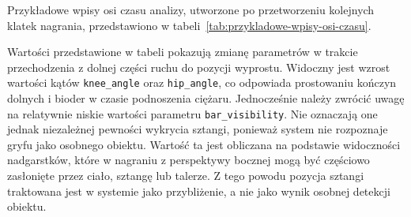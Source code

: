 Przykładowe wpisy osi czasu analizy, utworzone po przetworzeniu kolejnych klatek nagrania, przedstawiono w tabeli~\ref{tab:przykladowe-wpisy-osi-czasu}.

\begin{table}[H]
\centering
\caption{Przykładowe wpisy osi czasu analizy dla kolejnych klatek nagrania, pochodzące ze środkowej fazy ruchu. Źródło: opracowanie własne.}
\label{tab:przykladowe-wpisy-osi-czasu}
\scriptsize
{}
\end{table}

Wartości przedstawione w tabeli pokazują zmianę parametrów w trakcie przechodzenia z dolnej części ruchu do pozycji wyprostu. Widoczny jest wzrost wartości kątów \texttt{knee\_angle} oraz \texttt{hip\_angle}, co odpowiada prostowaniu kończyn dolnych i bioder w czasie podnoszenia ciężaru. Jednocześnie należy zwrócić uwagę na relatywnie niskie wartości parametru \texttt{bar\_visibility}. Nie oznaczają one jednak niezależnej pewności wykrycia sztangi, ponieważ system nie rozpoznaje gryfu jako osobnego obiektu. Wartość ta jest obliczana na podstawie widoczności nadgarstków, które w nagraniu z perspektywy bocznej mogą być częściowo zasłonięte przez ciało, sztangę lub talerze. Z tego powodu pozycja sztangi traktowana jest w systemie jako przybliżenie, a nie jako wynik osobnej detekcji obiektu.

